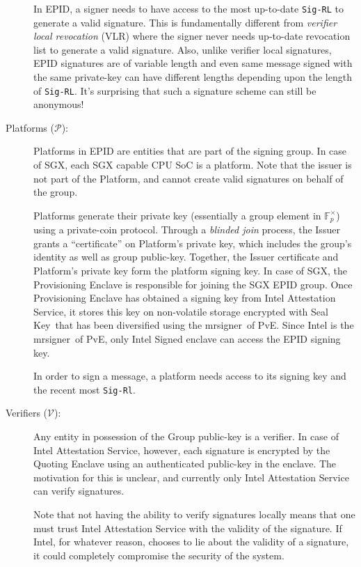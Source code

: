 \documentclass[letterpaper]{article}
\newcommand{\mrsigner}{\textsf{mrsigner}}
\newcommand{\pve}{\textsf{PvE}}
\newcommand{\sk}{\textsf{Seal Key}}
\begin{document}
\begin{description}
    In EPID, a signer needs to have access to the most up-to-date
    \texttt{Sig-RL} to generate a valid signature. This is
    fundamentally different from \textit{verifier local revocation}
    (VLR) \cite{BonehVLR} where the signer never needs up-to-date
    revocation list to generate a valid signature. Also, unlike
    verifier local signatures, EPID signatures are of variable length
    and even same message signed with the same private-key can have
    different lengths depending upon the length of
    \texttt{Sig-RL}. It's surprising that such a signature scheme can
    still be anonymous!

    \item[Platforms ($\mathcal{P}$):] Platforms in EPID are entities
      that are part of the signing group. In case of SGX, each SGX
      capable CPU SoC is a platform. Note that the issuer is not part
      of the Platform, and cannot create valid signatures on behalf of
      the group.

      Platforms generate their private key (essentially a group
      element in $\mathbb{F}_p^{\times}$) using a private-coin
      protocol. Through a \textit{blinded join} process, the Issuer
      grants a ``certificate'' on Platform's private key, which
      includes the group's identity as well as group
      public-key. Together, the Issuer certificate and Platform's
      private key form the platform signing key. In case of SGX, the
      \textsf{Provisioning Enclave} is responsible for joining the SGX
      EPID group. Once \textsf{Provisioning Enclave} has obtained a
      signing key from Intel Attestation Service, it stores this key
      on non-volatile storage encrypted with \sk\ that has been
      diversified using the \mrsigner\ of \pve. Since Intel is the
      \mrsigner\ of \pve, only Intel Signed enclave can access the
      EPID signing key.

      In order to sign a message, a platform needs access to its
      signing key and the recent most \texttt{Sig-Rl}.

    \item [Verifiers ($\mathcal{V}$):] Any entity in possession of the
      Group public-key is a verifier. In case of Intel Attestation
      Service, however, each signature is encrypted by the
      \textsf{Quoting Enclave} using an authenticated public-key in
      the enclave. The motivation for this is unclear, and currently
      only Intel Attestation Service can verify signatures.

      Note that not having the ability to verify signatures locally
      means that one must trust Intel Attestation Service with the
      validity of the signature. If Intel, for whatever reason,
      chooses to lie about the validity of a signature, it could
      completely compromise the security of the system.
  \end{description}
\end{document}
